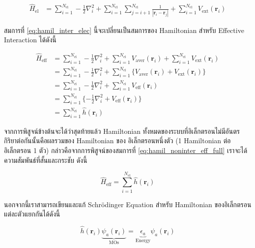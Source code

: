 \begin{align}\label{eq:hamil_inter_elec}
    \hat{H}_{\text{el}} &= \sum^{N_{\text{el}}}_{i=1} -\frac{1}{2} \nabla^{2}_{i} 
    + \sum^{N_{\text{el}}}_{i=1} \sum^{N_{\text{el}}}_{j=i+1} \frac{1}{|\bm{r}_{i}-\bm{r}_{j}|}
    + \sum^{N_{\text{el}}}_{i=1} V_{\text{ext}}(\bm{r}_{i})
\end{align}

\noindent สมการที่ \ref{eq:hamil_inter_elec} นี้จะเปลี่ยนเป็นสมการของ Hamiltonian สำหรับ Effective Interaction ได้ดังนี้

\begin{align}\label{eq:hamil_noninter_eff_full}
    \hat{H}_{\text{eff}} &= \sum^{N_{\text{el}}}_{i=1} -\frac{1}{2} \nabla^{2}_{i} 
    + \sum^{N_{\text{el}}}_{i=1} V_{\text{aver}}(\bm{r}_{i})
    + \sum^{N_{\text{el}}}_{i=1} V_{\text{ext}}(\bm{r}_{i}) \nonumber \\
    &= \sum^{N_{\text{el}}}_{i=1} -\frac{1}{2} \nabla^{2}_{i} 
    + \sum^{N_{\text{el}}}_{i=1} \{ V_{\text{aver}}(\bm{r}_{i}) + V_{\text{ext}}(\bm{r}_{i}) \} \nonumber \\
    &= \sum^{N_{\text{el}}}_{i=1} -\frac{1}{2} \nabla^{2}_{i} 
    + \sum^{N_{\text{el}}}_{i=1} V_{\text{eff}}(\bm{r}_{i}) \nonumber \\
    &= \sum^{N_{\text{el}}}_{i=1} \{ -\frac{1}{2} \nabla^{2}_{i} + V_{\text{eff}}(\bm{r}_{i}) \} \nonumber \\
    &= \sum^{N_{\text{el}}}_{i=1} \hat{h}(\bm{r}_{i})
\end{align}

จากการพิสูจน์ข้างต้นจะได้ว่าสุดท้ายแล้ว Hamiltonian ทั้งหมดของระบบที่อิเล็กตรอนไม่มีอันตรกิริยาต่อกันนั้นคือผลรวมของ Hamiltonian ของ%
อิเล็กตรอนหนึ่งตัว (1 Hamiltonian ต่ออิเล็กตรอน 1 ตัว) กล่าวคือจากการพิสูจน์ของสมการที่ \ref{eq:hamil_noninter_eff_full} 
เราจะได้ความสัมพันธ์ที่สั้นและกระชับ ดังนี้

\begin{equation}\label{eq:hamil_noninter_eff}
    \hat{H}_{\text{eff}} = \sum^{N_{\text{el}}}_{i=1} \hat{h}(\bm{r}_{i})
\end{equation}

นอกจากนี้เราสามารถเขียนและแก้ Schr\"{o}dinger Equation สำหรับ Hamiltonian ของอิเล็กตรอนแต่ละตัวแยกกันได้ดังนี้

\begin{equation}\label{eq:hamil_one_elec_mo}
    \hat{h}(\bm{r}_{i}) \underbrace{\psi_{a}(\bm{r}_{i})}_{\text{MOs}} = 
    \underbrace{\epsilon_{a}}_{\text{Energy}} \psi_{a}(\bm{r}_{i})
\end{equation}

